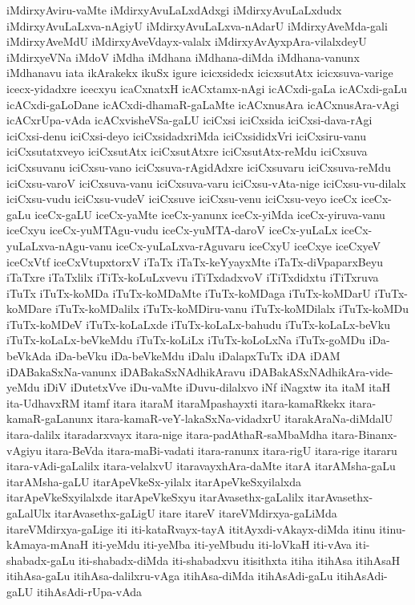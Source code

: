 {iMdirxyAviru-vaMte
iMdirxyAvuLaLxdAdxgi
iMdirxyAvuLaLxdudx
iMdirxyAvuLaLxva-nAgiyU
iMdirxyAvuLaLxva-nAdarU
iMdirxyAveMda-gali
iMdirxyAveMdU
iMdirxyAveVdayx-valalx
iMdirxyAvAyxpAra-vilalxdeyU
iMdirxyeVNa
iMdoV
iMdha
iMdhana
iMdhana-diMda
iMdhana-vanunx
iMdhanavu
iata
ikArakekx
ikuSx
igure
icicxsidedx
icicxsutAtx
icicxsuva-varige
icecx-yidadxre
icecxyu
icaCxnatxH
icACxtamx-nAgi
icACxdi-gaLa
icACxdi-gaLu
icACxdi-gaLoDane
icACxdi-dhamaR-gaLaMte
icACxnusAra
icACxnusAra-vAgi
icACxrUpa-vAda
icACxvisheVSa-gaLU
iciCxsi
iciCxsida
iciCxsi-dava-rAgi
iciCxsi-denu
iciCxsi-deyo
iciCxsidadxriMda
iciCxsididxVri
iciCxsiru-vanu
iciCxsutatxveyo
iciCxsutAtx
iciCxsutAtxre
iciCxsutAtx-reMdu
iciCxsuva
iciCxsuvanu
iciCxsu-vano
iciCxsuva-rAgidAdxre
iciCxsuvaru
iciCxsuva-reMdu
iciCxsu-varoV
iciCxsuva-vanu
iciCxsuva-varu
iciCxsu-vAta-nige
iciCxsu-vu-dilalx
iciCxsu-vudu
iciCxsu-vudeV
iciCxsuve
iciCxsu-venu
iciCxsu-veyo
iceCx
iceCx-gaLu
iceCx-gaLU
iceCx-yaMte
iceCx-yanunx
iceCx-yiMda
iceCx-yiruva-vanu
iceCxyu
iceCx-yuMTAgu-vudu
iceCx-yuMTA-daroV
iceCx-yuLaLx
iceCx-yuLaLxva-nAgu-vanu
iceCx-yuLaLxva-rAguvaru
iceCxyU
iceCxye
iceCxyeV
iceCxVtf
iceCxVtupxtorxV
iTaTx
iTaTx-keYyayxMte
iTaTx-diVpaparxBeyu
iTaTxre
iTaTxlilx
iTiTx-koLuLxvevu
iTiTxdadxvoV
iTiTxdidxtu
iTiTxruva
iTuTx
iTuTx-koMDa
iTuTx-koMDaMte
iTuTx-koMDaga
iTuTx-koMDarU
iTuTx-koMDare
iTuTx-koMDalilx
iTuTx-koMDiru-vanu
iTuTx-koMDilalx
iTuTx-koMDu
iTuTx-koMDeV
iTuTx-koLaLxde
iTuTx-koLaLx-bahudu
iTuTx-koLaLx-beVku
iTuTx-koLaLx-beVkeMdu
iTuTx-koLiLx
iTuTx-koLoLxNa
iTuTx-goMDu
iDa-beVkAda
iDa-beVku
iDa-beVkeMdu
iDalu
iDalapxTuTx
iDA
iDAM
iDABakaSxNa-vanunx
iDABakaSxNAdhikAravu
iDABakASxNAdhikAra-vide-yeMdu
iDiV
iDutetxVve
iDu-vaMte
iDuvu-dilalxvo
iNf
iNagxtw
ita
itaM
itaH
ita-UdhavxRM
itamf
itara
itaraM
itaraMpashayxti
itara-kamaRkekx
itara-kamaR-gaLanunx
itara-kamaR-veY-lakaSxNa-vidadxrU
itarakAraNa-diMdalU
itara-dalilx
itaradarxvayx
itara-nige
itara-padAthaR-saMbaMdha
itara-Binanx-vAgiyu
itara-BeVda
itara-maBi-vadati
itara-ranunx
itara-rigU
itara-rige
itararu
itara-vAdi-gaLalilx
itara-velalxvU
itaravayxhAra-daMte
itarA
itarAMsha-gaLu
itarAMsha-gaLU
itarApeVkeSx-yilalx
itarApeVkeSxyilalxda
itarApeVkeSxyilalxde
itarApeVkeSxyu
itarAvasethx-gaLalilx
itarAvasethx-gaLalUlx
itarAvasethx-gaLigU
itare
itareV
itareVMdirxya-gaLiMda
itareVMdirxya-gaLige
iti
iti-kataRvayx-tayA
ititAyxdi-vAkayx-diMda
itinu
itinu-kAmaya-mAnaH
iti-yeMdu
iti-yeMba
iti-yeMbudu
iti-loVkaH
iti-vAva
iti-shabadx-gaLu
iti-shabadx-diMda
iti-shabadxvu
itisithxta
itiha
itihAsa
itihAsaH
itihAsa-gaLu
itihAsa-dalilxru-vAga
itihAsa-diMda
itihAsAdi-gaLu
itihAsAdi-gaLU
itihAsAdi-rUpa-vAda
}

